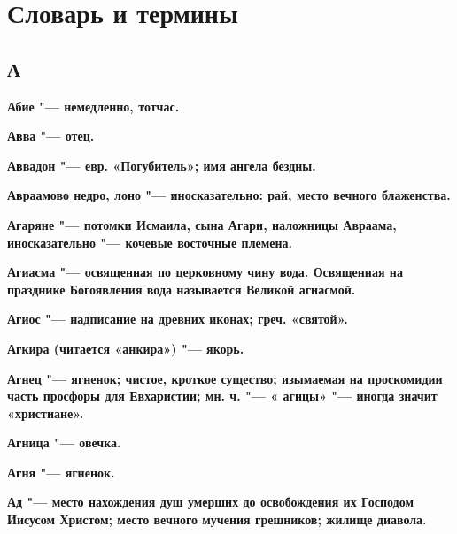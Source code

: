 

\chapter{Словарь и термины}
 
\begin{mymulticols}{2}\footnotesize

\section{А}


\bfseries Абие\normalfont{} "--- немедленно, тотчас. 




\bfseries Авва\normalfont{} "--- отец. 




\bfseries Аввадон\normalfont{} "--- евр. «Погубитель»; имя ангела бездны. 




\bfseries Авраамово недро, лоно\normalfont{} "--- иносказательно: рай, место вечного блаженства. 




\bfseries Агаряне\normalfont{} "--- потомки Исмаила, сына Агари, наложницы Авраама, иносказательно "--- кочевые восточные племена. 




\bfseries Агиасма\normalfont{} "--- освященная по церковному чину вода. Освященная на празднике Богоявления вода называется Великой агиасмой. 




\bfseries Агиос\normalfont{} "--- надписание на древних иконах; греч. «святой». 




\bfseries Агкира\normalfont{} (читается «анкира») "--- якорь. 




\bfseries Агнец\normalfont{} "--- ягненок; чистое, кроткое существо; изымаемая на проскомидии часть просфоры для Евхаристии; мн. ч. "--- « \bfseries агнцы\normalfont{}» "--- иногда значит «христиане». 




\bfseries Агница\normalfont{} "--- овечка. 




\bfseries Агня\normalfont{} "--- ягненок. 




\bfseries Ад\normalfont{} "--- место нахождения душ умерших до освобождения их Господом Иисусом Христом; место вечного мучения грешников; жилище диавола. 





\end{mymulticols}

